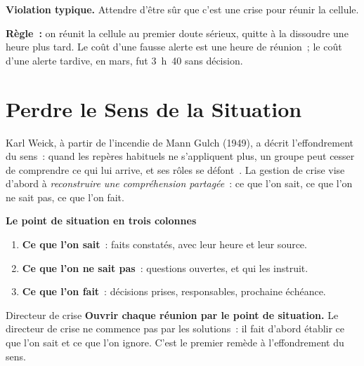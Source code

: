 \begin{boxalert}
\textbf{Violation typique.} Attendre d'être sûr que c'est une crise pour
réunir la cellule.

\smallskip
\textbf{Règle~:} on réunit la cellule au premier doute sérieux, quitte à la
dissoudre une heure plus tard. Le coût d'une fausse alerte est une heure
de réunion~; le coût d'une alerte tardive, en mars, fut 3~h~40 sans
décision.
\end{boxalert}

\section{Perdre le Sens de la Situation}
\label{sec:c21-sens}

Karl Weick, à partir de l'incendie de Mann Gulch (1949), a décrit
l'effondrement du sens~: quand les repères habituels ne s'appliquent plus,
un groupe peut cesser de comprendre ce qui lui arrive, et ses rôles se
défont~\cite{weick1993}. La gestion de crise vise d'abord à
\emph{reconstruire une compréhension partagée}~: ce que l'on sait, ce que
l'on ne sait pas, ce que l'on fait.

\begin{boxprocedure}
\textbf{Le point de situation en trois colonnes}
\begin{enumerate}
    \item \textbf{Ce que l'on sait}~: faits constatés, avec leur heure et
          leur source.
    \item \textbf{Ce que l'on ne sait pas}~: questions ouvertes, et qui les
          instruit.
    \item \textbf{Ce que l'on fait}~: décisions prises, responsables,
          prochaine échéance.
\end{enumerate}
\end{boxprocedure}

\begin{boxmetier}{Directeur de crise}
\textbf{Ouvrir chaque réunion par le point de situation.} Le directeur de
crise ne commence pas par les solutions~: il fait d'abord établir ce que
l'on sait et ce que l'on ignore. C'est le premier remède à l'effondrement
du sens.
\end{boxmetier}

\separateur

